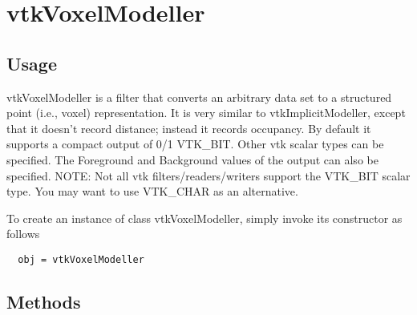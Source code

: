 \section{vtkVoxelModeller}

\subsection{Usage}

 vtkVoxelModeller is a filter that converts an arbitrary data set to a
 structured point (i.e., voxel) representation. It is very similar to 
 vtkImplicitModeller, except that it doesn't record distance; instead it
 records occupancy. By default it supports a compact output of 0/1
 VTK\_BIT. Other vtk scalar types can be specified. The Foreground and
 Background values of the output can also be specified.
 NOTE: Not all vtk filters/readers/writers support the VTK\_BIT
 scalar type. You may want to use VTK\_CHAR as an alternative.

To create an instance of class vtkVoxelModeller, simply
invoke its constructor as follows
\begin{verbatim}
  obj = vtkVoxelModeller
\end{verbatim}
\subsection{Methods}

